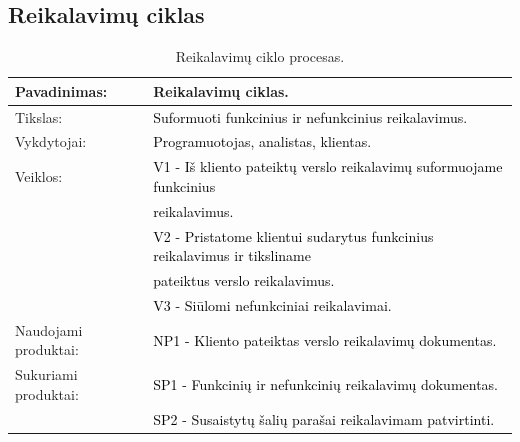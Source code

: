 \documentclass{VUMIFPSkursinis}
\begin{document}
	\subsection{Reikalavimų ciklas}
	\begin{center}
		\begin{table}[ht]
			\caption{Reikalavimų ciklo procesas.}
			\begin{tabular}{ | l | l | }
				\hline
				Pavadinimas:          & Reikalavimų ciklas.                                                                                                            \\ \hline
				Tikslas:              & \textcolor{black}{Suformuoti funkcinius ir nefunkcinius reikalavimus.}                                                         \\ \hline
				Vykdytojai:           & \textcolor{black}{Programuotojas, analistas, klientas.}                                                                        \\ \hline
				Veiklos:              & \textcolor{black}{V1 - Iš kliento pateiktų verslo reikalavimų suformuojame funkcinius} \\& \textcolor{black}{reikalavimus.}                       \\
				                      & \textcolor{black}{V2 - Pristatome klientui sudarytus funkcinius reikalavimus ir tiksliname} \\& \textcolor{black}{pateiktus verslo reikalavimus.} \\
				                      & \textcolor{black}{V3 - Siūlomi nefunkciniai reikalavimai.}                                                                     \\ \hline
				Naudojami produktai:  & \textcolor{black}{NP1 - Kliento pateiktas verslo reikalavimų dokumentas.}                                                      \\ \hline
				Sukuriami produktai:  & \textcolor{black}{SP1 - Funkcinių ir nefunkcinių reikalavimų dokumentas.}                                                      \\ \hline
				                      & \textcolor{black}{SP2 - Susaistytų šalių parašai reikalavimam patvirtinti.}                                                    \\ \hline
			\end{tabular}
		\end{table}
	\end{center}
\end{document}
